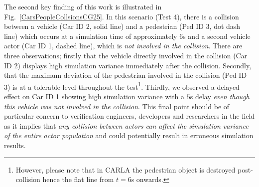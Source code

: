 \documentclass[letterpaper, 10 pt, journal, twoside]{IEEEtran}
\begin{document}
The second key finding of this work is illustrated in Fig.~\ref{CarsPeopleCollsionsCG25}. In this scenario (Test 4), there is a collision between a vehicle (Car ID 2, solid line) and a pedestrian (Ped ID 3, dot dash line) which occurs at a simulation time of approximately $6$s and a second vehicle actor (Car ID 1, dashed line), which is \textit{not involved in the collision}. There are three observations; firstly that the vehicle directly involved in the collision (Car ID 2) displays high simulation variance immediately after the collision.
Secondly, that the maximum deviation of the pedestrian involved in the collision (Ped ID 3) is at a tolerable level throughout the test\footnote{However, please note that in CARLA the pedestrian object is destroyed post-collision hence the flat line from $t=6$s onwards.}. Thirdly, we observed a delayed effect on Car ID 1 showing high simulation variance with a $5$s delay \textit{even though this vehicle was not involved in the collision}. This final point should be of particular concern to verification engineers, developers and researchers in the field as it implies that \textit{any collision between actors can affect the simulation variance of the entire actor population} and could potentially result in  erroneous simulation results. %





\end{document}

